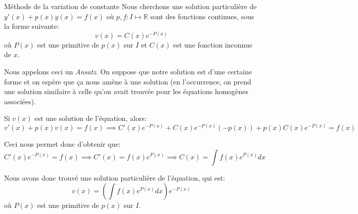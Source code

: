 \documentclass[a4paper]{article}
\begin{document}
\begin{parag}{Méthode de la variation de constante}
    Nous cherchons une solution particulière de $y'\left(x\right) + p\left(x\right)y\left(x\right) = f\left(x\right)$ où $p, f : I\mapsto \mathbb{R}$ sont des fonctions continues, sous la forme suivante:
    \[v\left(x\right) = C\left(x\right)e^{-P\left(x\right)}\]
    où $P\left(x\right)$ est une primitive de $p\left(x\right)$ sur $I$ et $C\left(x\right)$ est une fonction inconnue de $x$.

    Nous appelons ceci un \textit{Ansatz}. On suppose que notre solution est d'une certaine forme et on espère que ça nous amène à une solution (en l'occurrence, on prend une solution similaire à celle qu'on avait trouvée pour les équations homogènes associées).

    Si $v\left(x\right)$ est une solution de l'équation, alors:
    \[v'\left(x\right) + p\left(x\right) v\left(x\right) = f\left(x\right)\implies C'\left(x\right) e^{-P\left(x\right)} + C\left(x\right) e^{-P\left(x\right)}\left(-p\left(x\right)\right) + p\left(x\right)C\left(x\right)e^{-P\left(x\right)} = f\left(x\right)\]


    Ceci nous permet donc d'obtenir que:
    \[C'\left(x\right)e^{-P\left(x\right)} = f\left(x\right) \implies C'\left(x\right) = f\left(x\right)e^{P\left(x\right)} \implies C\left(x\right) = \int f\left(x\right) e^{P\left(x\right)}dx\]

    Nous avons donc trouvé une solution particulière de l'équation, qui est:
    \[v\left(x\right) = \left(\int f\left(x\right) e^{P\left(x\right)} dx\right) e^{-P\left(x\right)}\]
    où $P\left(x\right)$ est une primitive de $p\left(x\right)$ sur $I$.
\end{parag}
\end{document}
